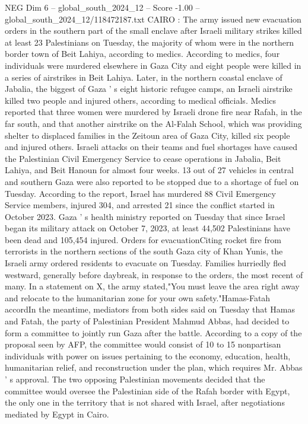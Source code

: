 \begin{textsample}{NEG Dim 6 – global\_south\_2024\_12 – Score -1.00 – global\_south\_2024\_12/118472187.txt}  \label{ex:f6_neg_117}
CAIRO : The army issued new evacuation orders in the southern part of the small enclave after Israeli military strikes killed at least 23 Palestinians on Tuesday, the majority of whom were in the northern border town of Beit Lahiya, according to medics.
According to medics, four individuals were murdered elsewhere in Gaza City and eight people were killed in a series of airstrikes in Beit Lahiya.
Later, in the northern coastal enclave of Jabalia, the biggest of Gaza ' s eight historic refugee camps, an Israeli airstrike killed two people and injured others, according to medical officials.
Medics reported that three women were murdered by Israeli drone fire near Rafah, in the far south, and that another airstrike on the Al-Falah School, which was providing shelter to displaced families in the Zeitoun area of Gaza City, killed six people and injured others.
Israeli attacks on their teams and fuel shortages have caused the Palestinian Civil Emergency Service to cease operations in Jabalia, Beit Lahiya, and Beit Hanoun for almost four weeks. 13 out of 27 vehicles in central and southern Gaza were also reported to be stopped due to a shortage of fuel on Tuesday.
According to the report, Israel has murdered 88 Civil Emergency Service members, injured 304, and arrested 21 since the conflict started in October 2023.
Gaza ' s health ministry reported on Tuesday that since Israel began its military attack on October 7, 2023, at least 44,502 Palestinians have been dead and 105,454 injured.
Orders for evacuationCiting rocket fire from terrorists in the northern sections of the south Gaza city of Khan Yunis, the Israeli army ordered residents to evacuate on Tuesday.
Families hurriedly fled westward, generally before daybreak, in response to the orders, the most recent of many.
In a statement on X, the army stated,"You must leave the area right away and relocate to the humanitarian zone for your own safety."Hamas-Fatah accordIn the meantime, mediators from both sides said on Tuesday that Hamas and Fatah, the party of Palestinian President Mahmud Abbas, had decided to form a committee to jointly run Gaza after the battle.
According to a copy of the proposal seen by AFP, the committee would consist of 10 to 15 nonpartisan individuals with power on issues pertaining to the economy, education, health, humanitarian relief, and reconstruction under the plan, which requires Mr.
Abbas ' s approval.
The two opposing Palestinian movements decided that the committee would oversee the Palestinian side of the Rafah border with Egypt, the only one in the territory that is not shared with Israel, after negotiations mediated by Egypt in Cairo.

\end{textsample}
